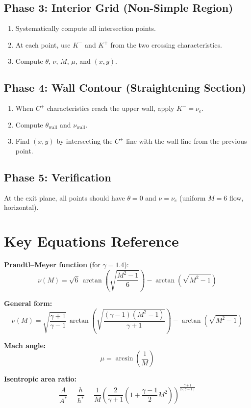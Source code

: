 \documentclass[11pt]{article}
\begin{document}
\subsection{Phase 3: Interior Grid (Non-Simple Region)}
\begin{enumerate}
    \item Systematically compute all intersection points.
    \item At each point, use $K^-$ and $K^+$ from the two crossing characteristics.
    \item Compute $\theta$, $\nu$, $M$, $\mu$, and $(x, y)$.
\end{enumerate}

\subsection{Phase 4: Wall Contour (Straightening Section)}
\begin{enumerate}
    \item When $C^+$ characteristics reach the upper wall, apply $K^- = \nu_e$.
    \item Compute $\theta_{\mathrm{wall}}$ and $\nu_{\mathrm{wall}}$.
    \item Find $(x, y)$ by intersecting the $C^+$ line with the wall line from the previous point.
\end{enumerate}

\subsection{Phase 5: Verification}
At the exit plane, all points should have $\theta = 0$ and $\nu = \nu_e$ (uniform $M = 6$ flow, horizontal).

\section{Key Equations Reference}

\textbf{Prandtl--Meyer function} (for $\gamma = 1.4$):
\begin{equation}
    \nu(M) = \sqrt{6}\,\arctan\!\left(\sqrt{\frac{M^2 - 1}{6}}\right) - \arctan\!\left(\sqrt{M^2 - 1}\right)
\end{equation}

\textbf{General form:}
\begin{equation}
    \nu(M) = \sqrt{\frac{\gamma+1}{\gamma-1}}\,\arctan\!\left(\sqrt{\frac{(\gamma-1)(M^2-1)}{\gamma+1}}\right) - \arctan\!\left(\sqrt{M^2-1}\right)
\end{equation}

\textbf{Mach angle:}
\begin{equation}
    \mu = \arcsin\!\left(\frac{1}{M}\right)
\end{equation}

\textbf{Isentropic area ratio:}
\begin{equation}
    \frac{A}{A^*} = \frac{h}{h^*} = \frac{1}{M}\left(\frac{2}{\gamma+1}\left(1 + \frac{\gamma-1}{2}M^2\right)\right)^{\!\frac{\gamma+1}{2(\gamma-1)}}
\end{equation}
\end{document}

